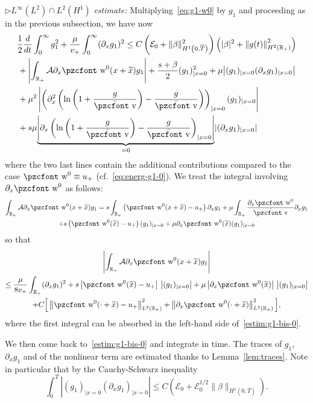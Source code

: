 \documentclass[10pt]{amsart}
\theoremstyle{definition}\newtheorem{defi}[theo]{Definition}\newtheorem{rema}[theo]{Remark}\newtheorem{exam}[theo]{Example}\newtheorem{exem}[theo]{Example}\newtheorem{nota}[theo]{Notation}
\newcommand{\mathpzc}[1]{\text{\pzcfont #1}}
\newcommand{\R}{\mathbb{R}}
\newcommand{\p}{\partial}
\newcommand{\bv}{\bar{\mathpzc{v}}}
\newcommand{\cA}{\mathcal A}
\newcommand{\cE}{\mathcal E}
\newcommand{\tw}{\mathpzc{w}}
\newcommand{\tx}{\widetilde{x}}
\begin{document}
$\rhd L^{\infty}(L^2)\cap L^2(H^1)$ \emph{estimate:} Multiplying~\eqref{eq:g1-w0} by $g_1$ and proceeding as in the previous subsection, we have now
\begin{multline}\label{estim:g1-bis-0}
\frac{1}{2}\frac{d}{dt}\int_0^\infty g_1^2 + \frac{\mu}{v_+}\int_0^\infty (\p_x g_1)^2 \leq C\left(\cE_0 + \|\beta\|_{H^1\left(0, \overline{T}\right)}^2\right)\left(|\beta|^2 + \left\| g(t) \right\|_{H^2(\R_+)}^2\right)\\
\begin{aligned}
& + \left|\int_{\R_+} \cA \partial_x \tw^0(x+ \tx) g_1 \right| + \dfrac{s+ \beta}{2} (g_1)_{|x=0}^2 + \mu \big|(g_1)_{|x=0}(\partial_x g_1)_{|x=0} \big| \\
& +\mu^2 \left|\left(\partial^2_x\left(\ln\left(1+ \frac{g}{\bv}\right) -\frac{g}{\bv} \right)\right)_{|x=0} (g_1)_{|x=0} \right|\\
&+ s\mu \underset{=0}{\underbrace{\left| \partial_x \left(\ln \left(1+ \frac{g}{\bv}\right) -\frac{g}{\bv} \right)_{|x=0}\right|}} |(\partial_x g_1)_{|x=0}|
\end{aligned}
\end{multline}
where the two last lines contain the additional contributions compared to the case $\tw^0 \equiv u_+$ (cf.~\eqref{eq:energ-g1-0}). We treat the integral involving $\partial_x \tw^0$ as follows:
\begin{multline*}
\int_{\R_+} \cA \partial_x \tw^0(x+ \tx) g_1  = s \int_{\R_+} \left(\tw^0(x+\tx) - u_+\right) \partial_x g_1 + \mu \int_{\R_+} \dfrac{\partial_x \tw^0}{\bv} \partial_x g_1 \\
+ s\left(\tw^0(\tx) - u_+\right) (g_1)_{|x=0} + \mu \partial_x \tw^0(\tx) (g_1)_{|x=0}
\end{multline*}
so that
\begin{multline*}
\left|\int_{\R_+} \cA \partial_x \tw^0(x+ \tx) g_1\right|\\
\leq \dfrac{\mu}{8v_+} \int_{\R_+} (\partial_x g_1)^2 + s \left|\tw^0(\tx) - u_+\right|\, \left|(g_1)_{|x=0}\right| + \mu \left|\partial_x \tw^0(\tx)\right|\, \left|(g_1)_{|x=0}\right| \\
 + C \Big[\left\|\tw^0(\cdot+\tx) - u_+\right\|_{L^2(\R_+)}^2 + \left\|\partial_x \tw^0(\cdot+\tx)\right\|_{L^2(\R_+)}^2 \Big],
\end{multline*}
where the first integral can be absorbed in the left-hand side of~\eqref{estim:g1-bis-0}.

We then come back to~\eqref{estim:g1-bis-0} and integrate in time. The traces of $g_1$, $\p_x g_1$ and of the nonlinear term are estimated thanks to Lemma~\ref{lem:traces}. Note in particular that by the Cauchy-Schwarz inequality
\[
\int_0^T \left| (g_1)_{|x=0}(\partial_x g_1)_{|x=0}\right| \leq {C \left(\cE_0 + \cE_0^{1/2} \|\beta\|_{H^1(0, \overline{T})}\right)}.
\]
\end{document}
